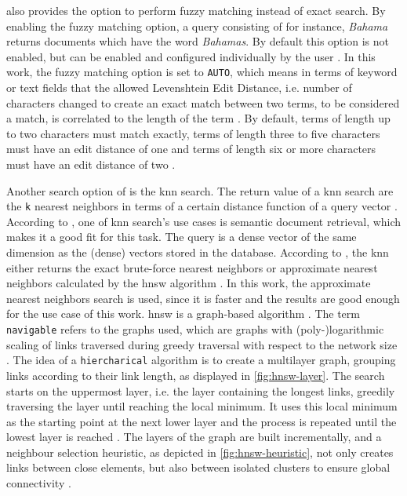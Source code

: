\databaseName{} also provides the option to perform fuzzy matching instead of exact search.
By enabling the fuzzy matching option, a \databaseName{} query consisting of for instance, \textit{Bahama} returns documents which have the word \textit{Bahamas}.
By default this option is not enabled, but can be enabled and configured individually by the user \cite{Elasticsearch-match}.
In this work, the fuzzy matching option is set to \texttt{AUTO}, which means in terms of keyword or text fields that the allowed Levenshtein Edit Distance, 
i.e. number of characters changed to create an exact match between two terms, to be considered a match, is correlated to the length of the term \cite{Elasticsearch-fuzziness}.
By default, terms of length up to two characters must match exactly, terms of length three to five characters must have an edit distance of one and 
terms of length six or more characters must have an edit distance of two \cite{Elasticsearch-fuzziness}.

Another search option of \databaseName{} is the \ac{knn} search.
The return value of a \ac{knn} search are the \texttt{k} nearest neighbors in terms of a certain distance function of a query vector \cite{Elasticsearch-kNN-HNSW}.
According to \citeauthor{Elasticsearch-kNN-HNSW}, one of \ac{knn} search's use cases is semantic document retrieval, which makes it a good fit for this task.
The query is a dense vector of the same dimension as the (dense) vectors stored in the database.
According to \cite{Elasticsearch-knn}, the \ac{knn} either returns the exact brute-force nearest neighbors or approximate nearest neighbors calculated by the \ac{hnsw} algorithm \cite{Elasticsearch-kNN-HNSW, Elasticsearch-knn}.
In this work, the approximate nearest neighbors search is used, since it is faster and the results are good enough for the use case of this work.
\ac{hnsw} is a graph-based algorithm \cite{Elasticsearch-kNN-HNSW}.
The term \texttt{navigable} refers to the graphs used, which are graphs with (poly-)logarithmic scaling of links traversed during greedy traversal with respect to the network size \cite{Elasticsearch-kNN-HNSW}.
The idea of a \texttt{hiercharical} algorithm is to create a multilayer graph, grouping links according to their link length, as displayed in \autoref{fig:hnsw-layer}. 
The search starts on the uppermost layer, i.e. the layer containing the longest links, greedily traversing the layer until reaching the local minimum.
It uses this local minimum as the starting point at the next lower layer and the process is repeated until the lowest layer is reached \cite{Elasticsearch-kNN-HNSW}.
The layers of the graph are built incrementally, and a neighbour selection heuristic, as depicted in \autoref{fig:hnsw-heuristic}, not only creates links between close elements, 
but also between isolated clusters to ensure global connectivity \cite{Elasticsearch-kNN-HNSW}.

